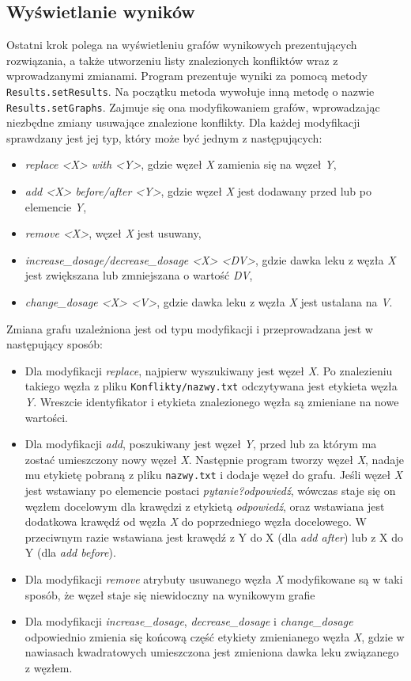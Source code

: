 \subsection{Wyświetlanie wyników}
\label{sect:revisions}
Ostatni krok polega na wyświetleniu grafów wynikowych prezentujących rozwiązania, a także utworzeniu listy znalezionych konfliktów wraz z wprowadzanymi zmianami. Program prezentuje wyniki za pomocą metody \texttt{Results.setResults}. Na początku metoda wywołuje inną metodę o nazwie \texttt{Results.setGraphs}. Zajmuje się ona modyfikowaniem grafów, wprowadzając niezbędne zmiany usuwające znalezione konflikty.
Dla każdej modyfikacji sprawdzany jest jej typ, który może być jednym z następujących:
\begin{itemize}
\item \textit{replace <X> with <Y>}, gdzie węzeł \textit{X} zamienia się na węzeł \textit{Y},
\item \textit{add <X> before/after <Y>}, gdzie węzeł \textit{X} jest dodawany przed lub po elemencie \textit{Y},
\item \textit{remove <X>}, węzeł \textit{X} jest usuwany,
\item \textit{increase\_dosage/decrease\_dosage <X> <DV>}, gdzie dawka leku z węzła \textit{X} jest zwiększana lub zmniejszana o wartość \textit{DV},
\item \textit{change\_dosage <X> <V>}, gdzie dawka leku z węzła \textit{X} jest ustalana na \textit{V}.  
\end{itemize}
Zmiana grafu uzależniona jest od typu modyfikacji i przeprowadzana jest w następujący sposób:
\begin{itemize}
\item Dla modyfikacji \textit{replace}, najpierw wyszukiwany jest węzeł \textit{X}. Po znalezieniu takiego węzła z pliku \texttt{Konflikty/nazwy.txt} odczytywana jest etykieta węzła \textit{Y}. Wreszcie identyfikator i etykieta znalezionego węzła są zmieniane na nowe wartości. 
\item Dla modyfikacji \textit{add}, poszukiwany jest węzeł \textit{Y}, przed lub za którym ma zostać umieszczony nowy węzeł \textit{X}. Następnie program tworzy węzeł \textit{X}, nadaje mu etykietę pobraną z pliku \texttt{nazwy.txt} i dodaje węzeł do grafu. Jeśli węzeł \textit{X} jest wstawiany po elemencie postaci \textit{pytanie?odpowiedź}, wówczas staje się on węzłem docelowym dla krawędzi z etykietą \textit{odpowiedź}, oraz wstawiana jest dodatkowa krawędź od węzła \textit{X} do poprzedniego węzła docelowego. W przeciwnym razie wstawiana jest krawędź z Y do X (dla \textit{add after}) lub z X do Y (dla \textit{add before}).
\item Dla modyfikacji \textit{remove} atrybuty usuwanego węzła \textit{X} modyfikowane są w taki sposób, że węzeł staje się niewidoczny na wynikowym grafie
\item Dla modyfikacji \textit{increase\_dosage}, \textit{decrease\_dosage} i \textit{change\_dosage} odpowiednio zmienia się końcową część etykiety zmienianego węzła \textit{X}, gdzie w nawiasach kwadratowych umieszczona jest zmieniona dawka leku związanego z węzłem. 

\end{itemize}

